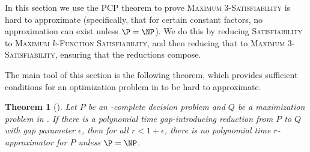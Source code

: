\documentclass[]{article}
\theoremstyle{plain}
\newtheorem{theorem}{Theorem}
\theoremstyle{definition}
\begin{document}
In this section we use the PCP theorem to prove \textsc{Maximum 3-Satisfiability} is hard to approximate (specifically, that for certain constant factors, no approximation can exist unless $\P = \NP$).
We do this by reducing \textsc{Satisfiability} to \textsc{Maximum $k$-Function Satisfiability}, and then reducing that to \textsc{Maximum 3-Satisfiability}, ensuring that the reductions compose.

The main tool of this section is the following theorem, which provides sufficient conditions for an optimization problem in \NPO{} to be hard to approximate.

\begin{theorem}[{\cite[Theorem~3.7]{book}}]\label{thm:gap}
  Let $P$ be an \NP-complete decision problem and $Q$ be a maximization problem in \NPO.
  If there is a polynomial time gap-introducing reduction from $P$ to $Q$ with gap parameter $\epsilon$, then for all $r < 1 + \epsilon$, there is no polynomial time $r$-approximator for $P$ unless $\P = \NP$.
\end{theorem}
\end{document}
